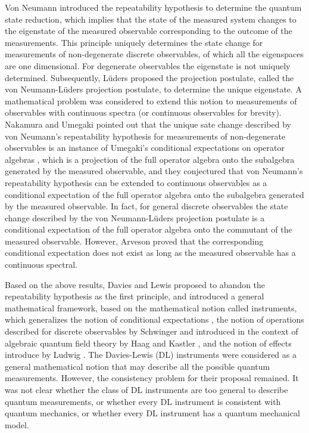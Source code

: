 \documentclass[12pt]{article}
\begin{document}
Von Neumann \cite{vN32E} introduced the repeatability hypothesis to determine the quantum
state reduction, which implies that the state of the measured system
changes to the eigenstate of the measured observable corresponding to the outcome
of the measurements.
This principle uniquely determines the state change for measurements of non-degenerate
discrete observables, of which all the eigenspaces are one dimensional. 
For degenerate observables the eigenstate is not uniquely
determined.   Subsequently, L\"{u}ders \cite{Lud51} proposed the
projection postulate, called the von Neumann-L\"{u}ders projection postulate,
to determine the unique eigenstate.
A mathematical problem was considered to extend this notion to measurements of
observables with continuous spectra (or continuous observables for brevity).
Nakamura and Umegaki \cite{NU62} pointed out that the unique sate change described 
by von Neumann's repeatability hypothesis for measurements of non-degenerate observables
 is an instance of Umegaki's conditional expectations on operator algebras \cite{Ume54}, 
 which is a projection of the full operator algebra onto the subalgebra generated by the measured 
 observable, and they conjectured that von Neumann's repeatability hypothesis can be
extended to continuous observables as a conditional expectation of the full operator algebra 
onto the subalgebra generated by the measured observable.
In fact, for general discrete observables the state change described by the 
von Neumann-L\"{u}ders projection postulate is a conditional expectation
of the full operator algebra onto the commutant of the measured observable.
 However, Arveson \cite{Arv67} proved that the corresponding conditional 
 expectation does not exist as long as the measured observable has a continuous
 spectral.
 
 Based on the above results, Davies and Lewis \cite{DL70} proposed to abandon
 the repeatability hypothesis as the first principle, and introduced a general 
 mathematical framework,
 based on the mathematical notion called instruments, which generalizes the notion
 of conditional expectations \cite{Ume54},  the notion of operations
 described for discrete observables by Schwinger \cite{Sch59,Sch60a,Sch60b}
 and introduced in the context of algebraic quantum field theory by 
 Haag and Kastler \cite{HK64}, and the notion of effects introduce by
 Ludwig \cite{Lud67,Lud68}.  
 The Davies-Lewis (DL) instruments were considered as a general mathematical notion
 that may describe all the possible quantum measurements.  However, the
 consistency problem for their proposal remained.
 It was not clear whether the class of DL instruments are too general to describe quantum
 measurements, or whether every DL instrument 
 is consistent with quantum mechanics, or whether every DL instrument
 has a quantum mechanical model.
  
\end{document}
